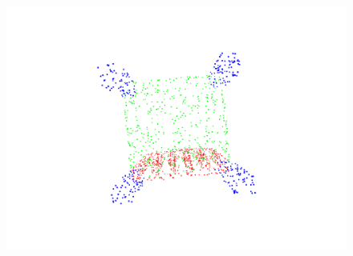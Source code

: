 \begin{figure}[htbp]
\begin{minipage}{0.25\textwidth}
        \centering
        \includegraphics[width=\textwidth]{fig/supplement/part_segmentation/chair/chair02.pdf}
    \end{minipage}
    \hfill

    \vspace{0.5em}


\end{figure}
